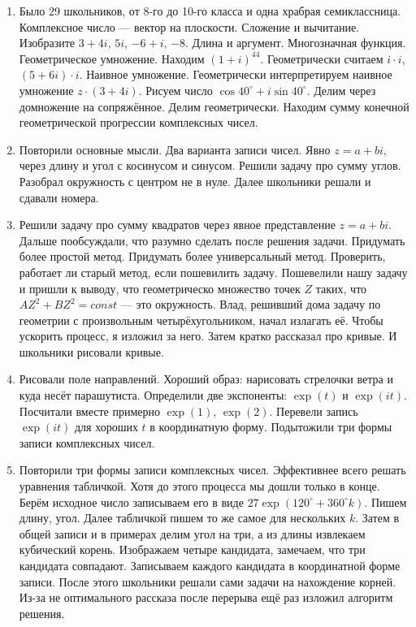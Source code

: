 \documentclass[12pt]{article}
\theoremstyle{definition}
\begin{document}
\begin{enumerate}
  \item Было 29 школьников, от 8-го до 10-го класса и одна храбрая семиклассница. Комплексное число — вектор на плоскости.
  Сложение и вычитание. Изобразите $3+4i$, $5i$, $-6 + i$, $-8$. Длина и аргумент. Многозначная функция. 
  Геометрическое умножение. Находим $(1+i)^{44}$. Геометрически считаем $i \cdot i$, $(5 + 6i) \cdot i$. Наивное умножение.
  Геометрически интерпретируем наивное умножение $z \cdot (3 + 4i)$.
  Рисуем число $\cos 40^{\circ} + i \sin 40^{\circ}$. Делим через домножение на сопряжённое.
  Делим геометрически. Находим сумму конечной геометрической прогрессии комплексных чисел. 
  \item Повторили основные мысли. Два варианта записи чисел. Явно $z=a + bi$, через длину и угол с косинусом и синусом.
  Решили задачу про сумму углов. Разобрал окружность с центром не в нуле. Далее школьники решали и сдавали номера.
  \item Решили задачу про сумму квадратов через явное представление $z=a+bi$.
  Дальше пообсуждали, что разумно сделать после решения задачи. 
  Придумать более простой метод. Придумать более универсальный метод. 
  Проверить, работает ли старый метод, если пошевилить задачу.
  Пошевелили нашу задачу и пришли к выводу, что геометрическо множество точек $Z$ таких, что
  $AZ^2 + BZ^2 = const$ — это окружность. 
  Влад, решивший дома задачу по геометрии с произвольным четырёхугольником, начал излагать её. 
  Чтобы ускорить процесс, я изложил за него. Затем кратко рассказал про кривые. 
  И школьники рисовали кривые. 
  \item Рисовали поле направлений. Хороший образ: нарисовать стрелочки ветра и куда несёт парашутиста. 
  Определили две экспоненты: $\exp(t)$ и $\exp(it)$. Посчитали вместе примерно $\exp(1)$, $\exp(2)$.
  Перевели запись $\exp(it)$ для хороших $t$ в координатную форму. Подытожили три формы записи комплексных чисел. 
  \item Повторили три формы записи комплексных чисел. Эффективнее всего решать уравнения табличкой. Хотя до этого процесса мы 
  дошли только в конце. 
  Берём исходное число записываем его в виде $27 \exp(120^{\circ} + 360^{\circ}k)$. Пишем длину, угол. 
  Далее табличкой пишем то же самое для нескольких $k$. Затем в общей записи и в примерах делим угол на три, а из длины извлекаем 
  кубический корень. Изображаем четыре кандидата, замечаем, что три кандидата совпадают. Записываем каждого кандидата в координатной форме записи.
  После этого школьники решали сами задачи на нахождение корней. Из-за не оптимального рассказа после перерыва ещё раз изложил алгоритм решения. 
\end{enumerate}
\end{document}
